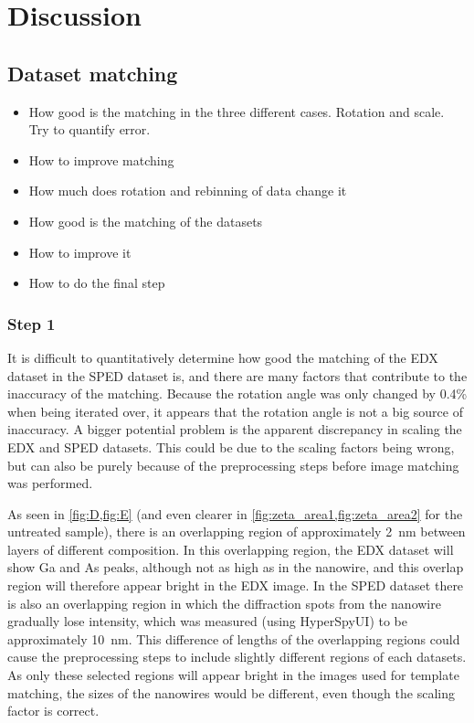 \chapter{Discussion}

\section{Dataset matching}


\begin{itemize}
	\item How good is the matching in the three different cases. Rotation and scale. Try to quantify error.
	\item How to improve matching
	\item How much does rotation and rebinning of data change it
	\item How good is the matching of the datasets
	\item How to improve it
	\item How to do the final step
\end{itemize}

\subsection{Step 1}

It is difficult to quantitatively determine how good the matching of the EDX dataset in the SPED dataset is, and there are many factors that contribute to the inaccuracy of the matching. Because the rotation angle was only changed by 0.4\% when being iterated over, it appears that the rotation angle is not a big source of inaccuracy. A bigger potential problem is the apparent discrepancy in scaling the EDX and SPED datasets. This could be due to the scaling factors being wrong, but can also be purely because of the preprocessing steps before image matching was performed.

As seen in \cref{fig:D,fig:E} (and even clearer in \cref{fig:zeta_area1,fig:zeta_area2} for the untreated sample), there is an overlapping region of approximately \SI{2}{\nano\meter} between layers of different composition. In this overlapping region, the EDX dataset will show Ga and As peaks, although not as high as in the nanowire, and this overlap region will therefore appear bright in the EDX image. In the SPED dataset there is also an overlapping region in which the diffraction spots from the nanowire gradually lose intensity, which was measured (using HyperSpyUI) to be approximately \SI{10}{\nano \meter}. This difference of lengths of the overlapping regions could cause the preprocessing steps to include slightly different regions of each datasets. As only these selected regions will appear bright in the images used for template matching, the sizes of the nanowires would be different, even though the scaling factor is correct.

